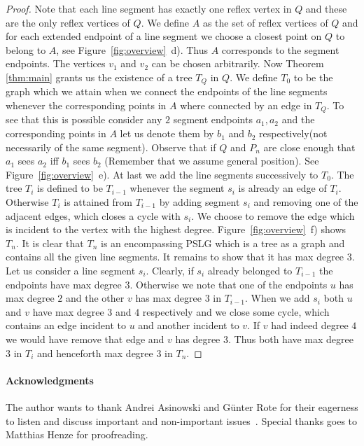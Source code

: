 \documentclass[12pt]{article}
\begin{document}
\begin{proof}
Note that each line segment has exactly one reflex vertex in $Q$ and these are the only reflex vertices of $Q$. We define $A$ as the set of reflex vertices of $Q$ and for each extended endpoint of a line segment we choose a closest point on $Q$ to belong to $A$, see Figure~\ref{fig:overview}~d). Thus $A$ corresponds to the segment endpoints. The vertices $v_1$ and $v_2$ can be chosen arbitrarily.
Now Theorem \ref{thm:main} grants us the existence of a tree $T_Q$ in $Q$. We define $T_0$ to be the graph which we attain when we connect the endpoints of the line segments whenever the corresponding points in $A$ where connected by an edge in $T_Q$. To see that this is possible consider any $2$ segment endpoints $a_1, a_2$ and the corresponding points in $A$ let us denote them by $b_1$ and $b_2$ respectively(not necessarily of the same segment). Observe that if $Q$ and $P_n$ are close enough that $a_1$ sees $a_2$ iff $b_1$ sees $b_2$ (Remember that we assume general position).
See Figure~\ref{fig:overview}~e). 
At last we add the line segments successively to $T_0$. The tree $T_{i}$ is defined to be $T_{i-1}$ whenever the segment $s_i$ is already an edge of $T_i$. Otherwise $T_{i}$ is attained from $T_{i-1}$ by adding segment $s_i$ and removing one of the adjacent edges, which closes a cycle with $s_i$. We choose to remove the edge which is incident to the vertex with the highest degree. Figure~\ref{fig:overview}~f) shows $T_n$.
It is clear that $T_{n}$ is an encompassing PSLG which is a tree as a graph and contains all the given line segments. It remains to show that it has max degree $3$. 
Let us consider a line segment $s_i$. Clearly, if $s_i$ already belonged to $T_{i-1}$ the endpoints have max degree $3$. Otherwise we note that one of the endpoints $u$ has max degree $2$ and the other $v$ has max degree $3$ in $T_{i-1}$. When we add $s_i$ both $u$ and $v$ have max degree $3$ and $4$ respectively and we close some cycle, which contains an edge incident to $u$ and another incident to $v$. If $v$ had indeed degree $4$ we would have remove that edge and $v$ has degree $3$. Thus both have max degree $3$ in $T_i$ and henceforth max degree $3$ in $T_n$.
\end{proof}


\paragraph{Acknowledgments}
The author wants to thank Andrei Asinowski and G\"{u}nter Rote for their eagerness to listen and discuss important and non-important issues~\smiley. Special thanks goes to Matthias Henze for proofreading.




\end{document}
